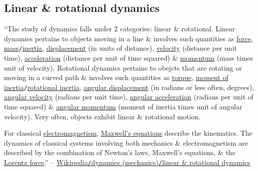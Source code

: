 \documentclass{article}
\numberwithin{equation}{section}
\begin{document}
\subsection{Linear \& rotational dynamics}
``The study of dynamics falls under 2 categories: linear \& rotational. Linear dynamics pertains to objects moving in a line \& involves such quantities as \href{https://en.wikipedia.org/wiki/Force}{force}, \href{https://en.wikipedia.org/wiki/Mass}{mass}\texttt{/}\href{https://en.wikipedia.org/wiki/Inertia#Mass_and_inertia}{inertia}, \href{https://en.wikipedia.org/wiki/Displacement_(vector)}{displacement} (in units of distance), \href{https://en.wikipedia.org/wiki/Velocity}{velocity} (distance per unit time), \href{https://en.wikipedia.org/wiki/Acceleration}{acceleration} (distance per unit of time squared) \& \href{https://en.wikipedia.org/wiki/Momentum}{momentum} (mass times unit of velocity). Rotational dynamics pertains to obejcts that are rotating or moving in a curved path \& involves such quantities as \href{https://en.wikipedia.org/wiki/Torque}{torque}, \href{https://en.wikipedia.org/wiki/Moment_of_inertia}{moment of inertia}\texttt{/}\href{https://en.wikipedia.org/wiki/Rotational_inertia}{rotational inertia}, \href{https://en.wikipedia.org/wiki/Angular_displacement}{angular displacement} (in radians or less often, degrees), \href{https://en.wikipedia.org/wiki/Angular_velocity}{angular velocity} (radians per unit time), \href{https://en.wikipedia.org/wiki/Angular_acceleration}{angular acceleration} (radians per unit of time squared) \& \href{https://en.wikipedia.org/wiki/Angular_momentum}{angular momentum} (moment of inertia times unit of angular velocity). Very often, objects exhibit linear \& rotational motion.

For classical \href{https://en.wikipedia.org/wiki/Electromagnetism}{electromagnetism}, \href{https://en.wikipedia.org/wiki/Maxwell%27s_equations}{Maxwell's equations} describe the kinematics. The dynamics of classical systems involving both mechanics \& electromagnetism are described by the combination of Newton's laws, Maxwell's equations, \& the \href{https://en.wikipedia.org/wiki/Lorentz_force}{Lorentz force}.'' -- \href{https://en.wikipedia.org/wiki/Dynamics_(mechanics)#Linear_and_rotational_dynamics}{Wikipedia\texttt{/}dynamics (mechanics)\texttt{/}linear \& rotational dynamics}
\end{document}

